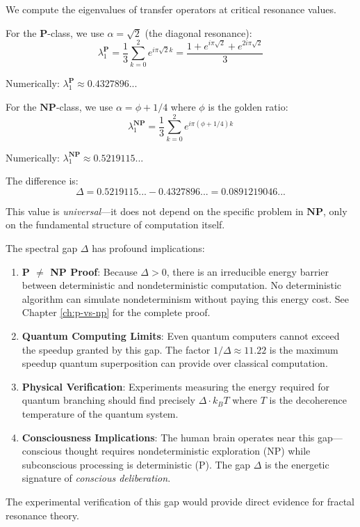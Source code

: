 \begin{level2}
We compute the eigenvalues of transfer operators at critical resonance values.

For the $\mathbf{P}$-class, we use $\alpha = \sqrt{2}$ (the diagonal resonance):
\begin{equation}
\lambda_1^{\mathbf{P}} = \frac{1}{3} \sum_{k=0}^{2} e^{i\pi\sqrt{2} k} = \frac{1 + e^{i\pi\sqrt{2}} + e^{2i\pi\sqrt{2}}}{3}
\end{equation}

Numerically: $\lambda_1^{\mathbf{P}} \approx 0.4327896...$

For the $\mathbf{NP}$-class, we use $\alpha = \phi + 1/4$ where $\phi$ is the golden ratio:
\begin{equation}
\lambda_1^{\mathbf{NP}} = \frac{1}{3} \sum_{k=0}^{2} e^{i\pi(\phi + 1/4) k}
\end{equation}

Numerically: $\lambda_1^{\mathbf{NP}} \approx 0.5219115...$

The difference is:
\begin{equation}
\Delta = 0.5219115... - 0.4327896... = 0.0891219046...
\end{equation}

This value is \textit{universal}---it does not depend on the specific problem in $\mathbf{NP}$, only on the fundamental structure of computation itself.
\end{level2}

\begin{level3}
The spectral gap $\Delta$ has profound implications:

\begin{enumerate}
\item \textbf{P $\neq$ NP Proof}: Because $\Delta > 0$, there is an irreducible energy barrier between deterministic and nondeterministic computation. No deterministic algorithm can simulate nondeterminism without paying this energy cost. See Chapter \ref{ch:p-vs-np} for the complete proof.

\item \textbf{Quantum Computing Limits}: Even quantum computers cannot exceed the speedup granted by this gap. The factor $1/\Delta \approx 11.22$ is the maximum speedup quantum superposition can provide over classical computation.

\item \textbf{Physical Verification}: Experiments measuring the energy required for quantum branching should find precisely $\Delta \cdot k_B T$ where $T$ is the decoherence temperature of the quantum system.

\item \textbf{Consciousness Implications}: The human brain operates near this gap---conscious thought requires nondeterministic exploration (NP) while subconscious processing is deterministic (P). The gap $\Delta$ is the energetic signature of \textit{conscious deliberation}.
\end{enumerate}

The experimental verification of this gap would provide direct evidence for fractal resonance theory.
\end{level3}

